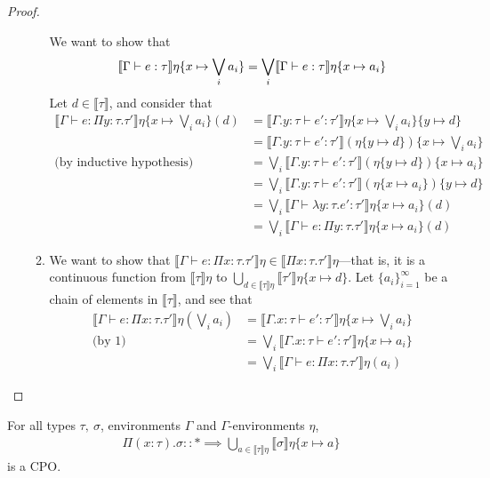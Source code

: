 \begin{proof}
\begin{itemize}
\begin{enumerate}
 We want to show that
 \begin{align*}
 \llbracket{{\Gamma}\vdash{e}:{\tau}}\rrbracket{\eta\{{x}\mapsto{\bigvee_i a_i}\}} =
\bigvee_i\llbracket{{\Gamma}\vdash{e}:{\tau}}\rrbracket{\eta\{{x}\mapsto{a_i}\}}
\end{align*}
Let $d \in \llbracket \tau \rrbracket$, and consider that
\begin{align*}
\llbracket \Gamma \vdash e : \Pi y: \tau.\tau' \rrbracket\eta\{x\mapsto  \bigvee_i a_i\}(d) 
&= \llbracket \Gamma.y : \tau \vdash e' : \tau'\rrbracket\eta\{x\mapsto  \bigvee_i a_i\}
\{y \mapsto d\} \\
&= \llbracket \Gamma.y : \tau \vdash e' : \tau'\rrbracket(\eta\{y \mapsto d\})\{x\mapsto  \bigvee_i a_i\} \\
\text{(by inductive hypothesis)}&=\bigvee_i\llbracket \Gamma.y:\tau\vdash e':\tau'\rrbracket(\eta\{y\mapsto d\})
\{x\mapsto a_i\} \\
&=\bigvee_i\llbracket \Gamma.y:\tau\vdash e':\tau'\rrbracket(\eta\{x\mapsto a_i\})\{y\mapsto d\} \\
&= \bigvee_i \llbracket \Gamma \vdash \lambda y : \tau.e' : \tau' \rrbracket \eta\{x\mapsto a_i\}(d) \\
&= \bigvee_i \llbracket \Gamma \vdash e : \Pi y:\tau.\tau' \rrbracket \eta\{x\mapsto a_i\}(d) 
\end{align*}
%
 \item We want to show that $\llbracket \Gamma \vdash e : \Pi x:\tau.\tau' \rrbracket\eta \in \llbracket \Pi x:\tau.
 \tau'\rrbracket\eta$---that is, it is a continuous function from $\llbracket \tau \rrbracket\eta$ to 
 $\bigcup_{d\in \llbracket \tau \rrbracket\eta}\llbracket \tau' \rrbracket\eta\{x \mapsto d\}$. Let 
 $\{a_i\}^{\infty}_{i=1}$ be a chain of elements in $\llbracket \tau \rrbracket$, and see that
 \begin{align*}
 \llbracket \Gamma \vdash e : \Pi x:\tau.\tau' \rrbracket\eta(\bigvee_i a_i) &= \llbracket \Gamma.x : \tau 
 \vdash e' : \tau'\rrbracket\eta \{x \mapsto \bigvee_i a_i\} \\
 \text{(by 1)} &= \bigvee_i \llbracket \Gamma.x : \tau \vdash e' : \tau'\rrbracket\eta\{x\mapsto a_i\}\\
 &= \bigvee_i \llbracket \Gamma \vdash e : \Pi x:\tau.\tau' \rrbracket\eta(a_i) 
 \end{align*}
 \end{enumerate} 
\end{itemize}
\end{proof}


\begin{lemma}
For all types $\tau, \ \sigma$, environments $\Gamma$ and $\Gamma$-environments $\eta$,
\begin{align*}
\Pi(x : \tau).\sigma :: * \implies \bigcup_{a \in \llbracket \tau \rrbracket\eta}
\llbracket \sigma \rrbracket\eta\{x\mapsto a\} 
\end{align*}
is a CPO.
\end{lemma}

